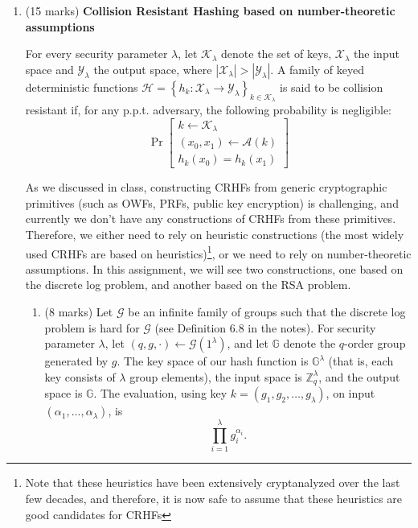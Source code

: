 \documentclass[11pt]{article}
\newcommand{\grp}{\mathbb{G}}
\newcommand{\Z}{\mathbb{Z}}
\newcommand{\calA}{\mathcal{A}}
\newcommand{\calG}{\mathcal{G}}
\newcommand{\calH}{\mathcal{H}}
\newcommand{\calK}{\mathcal{K}}
\newcommand{\calX}{\mathcal{X}}
\newcommand{\calY}{\mathcal{Y}}
\newcommand{\set}[1]{\left\{ #1 \right\}}
\begin{document}
    \begin{enumerate}

        \item (15 marks) \textbf{Collision Resistant Hashing based on number-theoretic assumptions}

        For every security parameter $\lambda$, let $\calK_{\lambda}$ denote the set of keys, $\calX_{\lambda}$ the input space and $\calY_{\lambda}$ the output space, where $|\calX_{\lambda}| > |\calY_{\lambda}|$. A family of keyed deterministic functions $\calH = \set{h_k : \calX_{\lambda} \to \calY_{\lambda}}_{k \in \calK_{\lambda}}$ is said to be collision resistant if, for any p.p.t. adversary, the following probability is negligible: 
        \[
            \Pr\left[ 
                \begin{array}{c}
                    k \gets \calK_{\lambda} \\ 
                    (x_0, x_1) \gets \calA(k) \\
                    h_k(x_0) = h_k(x_1)
                \end{array}
            \right]
        \]

        \medskip 

        As we discussed in class, constructing CRHFs from generic cryptographic primitives (such as OWFs, PRFs, public key encryption) is challenging, and currently we don't have any constructions of CRHFs from these primitives. Therefore, we either need to rely on heuristic constructions (the most widely used CRHFs are based on heuristics)\footnote{Note that these heuristics have been extensively cryptanalyzed over the last few decades, and therefore, it is now safe to assume that these heuristics are good candidates for CRHFs}, or we need to rely on number-theoretic assumptions. In this assignment, we will see two constructions, one based on the discrete log problem, and another based on the RSA problem. 

        \begin{enumerate}
            \item (8 marks) Let $\calG$ be an infinite family of groups such that the discrete log problem is hard for $\calG$ (see Definition 6.8 in the notes). For security parameter $\lambda$, let $(q, g, \cdot) \gets \calG(1^{\lambda})$, and let $\grp$ denote the $q$-order group generated by $g$. The key space of our hash function is $\grp^{\lambda}$ (that is, each key consists of $\lambda$ group elements), the input space is $\Z_q^{\lambda}$, and the output space is $\grp$. The evaluation, using key $k = (g_1, g_2, \ldots, g_{\lambda})$, on input $(\alpha_1, \ldots, \alpha_{\lambda})$, is $$ \prod_{i=1}^{\lambda} g_i^{\alpha_i}.$$


\end{enumerate}
\end{enumerate}
\end{document}
